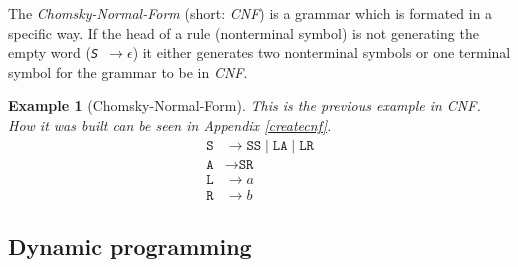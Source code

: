 \documentclass[a4paper, 11pt]{article}
\newtheorem*{example*}{Example}
\begin{document}
The \textit{Chomsky-Normal-Form} (short: \textit{CNF}) is a grammar which is formated in a specific way. If the head of a rule (nonterminal symbol) is not generating the empty word (\textit{\texttt{S $\rightarrow \epsilon$}}) it either generates two nonterminal symbols or one terminal symbol for the grammar to be in \textit{CNF}.
\cite{CNF}

\begin{example*}[Chomsky-Normal-Form]
This is the previous example in CNF. How it was built can be seen in Appendix \ref{createcnf}.
\begin{align*}
\texttt{S} & \rightarrow \texttt{SS} \mid  \texttt{LA} \mid \texttt{LR} \\
\texttt{A} & \rightarrow \texttt{SR} \\
\texttt{L} & \rightarrow a \\
\texttt{R} & \rightarrow b
\end{align*}
\end{example*}



\subsection{Dynamic programming}
\label{dp}
\end{document}
